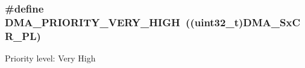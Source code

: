 \subsubsection[{\texorpdfstring{D\+M\+A\+\_\+\+P\+R\+I\+O\+R\+I\+T\+Y\+\_\+\+V\+E\+R\+Y\+\_\+\+H\+I\+GH}{DMA_PRIORITY_VERY_HIGH}}]{\setlength{\rightskip}{0pt plus 5cm}\#define D\+M\+A\+\_\+\+P\+R\+I\+O\+R\+I\+T\+Y\+\_\+\+V\+E\+R\+Y\+\_\+\+H\+I\+GH~((uint32\+\_\+t)D\+M\+A\+\_\+\+Sx\+C\+R\+\_\+\+PL)}\hypertarget{group___d_m_a___priority__level_gaed0542331a4d875d1d8d5b2878e9372c}{}\label{group___d_m_a___priority__level_gaed0542331a4d875d1d8d5b2878e9372c}
Priority level\+: Very High 
